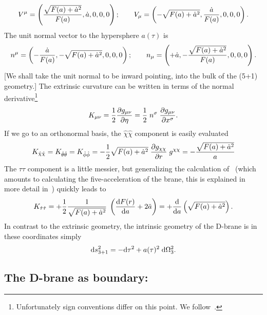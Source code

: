 \documentclass[a4paper,12pt]{article}
\begin{document}
%
\begin{equation}
V^\mu = \left({\sqrt{F(a)+\dot a^2}\over F(a)},\dot a, 0,0,0\right); \qquad 
V_\mu =
\left(-\sqrt{F(a)+\dot a^2},{\dot a\over F(a)},0,0,0\right).
\end{equation}
%
The unit normal vector to the hypersphere $a(\tau)$ is
%
\begin{equation}
n^\mu = \left(-{\dot a\over F(a)},-\sqrt{F(a)+ \dot a^2},0,0,0\right); \qquad 
n_\mu = \left(+\dot a,-{\sqrt{F(a)+\dot a^2}\over F(a)},0,0,0\right).
\end{equation}
%
[We shall take the unit normal to be inward pointing, into the bulk of
the (5+1) geometry.]  The extrinsic curvature can be written in terms
of the normal derivative\footnote{
Unfortunately sign conventions differ on this point. 
We follow~\cite{Book}.}
%
\begin{equation}
K_{\mu\nu} 
= {1\over2}  {\partial g_{\mu\nu}\over\partial \eta}
= {1\over2} \; n^\sigma \;  {\partial g_{\mu\nu}\over\partial x^\sigma}.
\end{equation}
%
If we go to an orthonormal basis, the $\hat{\chi}\hat{\chi}$ component
is easily evaluated
%
\begin{equation}
K_{\hat{\chi}\hat{\chi}} = K_{{\hat{\theta}}{\hat{\theta}}} = K_{\hat{\phi}\hat{\phi}} 
= - {1\over2}  \sqrt{F(a)+\dot a^2} \; {\partial g_{\chi\chi}\over\partial r} \; 
   g^{\chi\chi} 
= - {\sqrt{F(a)+\dot a^2}\over a}
\end{equation}
%
The $\tau\tau$ component is a little messier, but generalizing the
calculation of~\cite{Surgery} (which amounts to calculating the
five-acceleration of the brane, this is explained in more detail
in~\cite{Book}) quickly leads to
%
\begin{equation}
K_{\hat{\tau}\hat{\tau}} 
= + {1\over2}  {1\over\sqrt{F(a)+\dot a^2}} \; 
\left({{\mathrm d} F(r)\over{\mathrm d} a} + 2 \ddot a \right)
= + {{\mathrm d}\over{\mathrm d} a} \left(\sqrt{F(a)+\dot a^2}\right) .
\end{equation}
%
In contrast to the extrinsic geometry, the intrinsic geometry of the
D-brane is in these coordinates simply
%
\begin{equation}
{\mathrm d} s^2_{3+1} = - {\mathrm d}\tau^2 + a(\tau)^2  \; {\mathrm d}\Omega_3^2.
\end{equation}
%

\subsection{The D-brane as boundary:}
\end{document}
